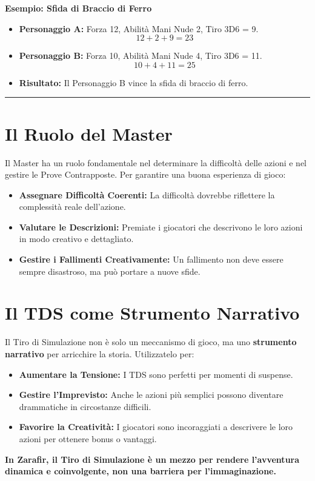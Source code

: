 \documentclass[../manuale_main.tex]{subfiles}
\begin{document}
\textbf{Esempio: Sfida di Braccio di Ferro}

\begin{itemize}
 \item \textbf{Personaggio A:} Forza 12, Abilità Mani Nude 2, Tiro 3D6 = 9.
 \[
 12 + 2 + 9 = 23
 \]
 
 \item \textbf{Personaggio B:} Forza 10, Abilità Mani Nude 4, Tiro 3D6 = 11.
 \[
 10 + 4 + 11 = 25
 \]
 
 \item \textbf{Risultato:} Il Personaggio B vince la sfida di braccio di ferro.
\end{itemize}

\vspace{0.5cm}
\noindent
\begin{center}
\rule{\textwidth}{0.4pt} 
\end{center}
\vspace{0.5cm}

\section*{Il Ruolo del Master}
Il Master ha un ruolo fondamentale nel determinare la difficoltà delle azioni e nel gestire le Prove Contrapposte. Per garantire una buona esperienza di gioco:

\begin{itemize}
 \item \textbf{Assegnare Difficoltà Coerenti:} La difficoltà dovrebbe riflettere la complessità reale dell'azione.
 \item \textbf{Valutare le Descrizioni:} Premiate i giocatori che descrivono le loro azioni in modo creativo e dettagliato.
 \item \textbf{Gestire i Fallimenti Creativamente:} Un fallimento non deve essere sempre disastroso, ma può portare a nuove sfide.
\end{itemize}

\vspace{0.3cm}

\section*{Il TDS come Strumento Narrativo}
Il Tiro di Simulazione non è solo un meccanismo di gioco, ma uno \textbf{strumento narrativo} per arricchire la storia. Utilizzatelo per:

\begin{itemize}
 \item \textbf{Aumentare la Tensione:} I TDS sono perfetti per momenti di suspense.
 \item \textbf{Gestire l'Imprevisto:} Anche le azioni più semplici possono diventare drammatiche in circostanze difficili.
 \item \textbf{Favorire la Creatività:} I giocatori sono incoraggiati a descrivere le loro azioni per ottenere bonus o vantaggi.
\end{itemize}

\textbf{In Zarafir, il Tiro di Simulazione è un mezzo per rendere l’avventura dinamica e coinvolgente, non una barriera per l’immaginazione.}
\end{document}
